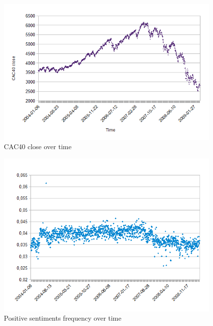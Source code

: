 \documentclass{beamer}
\begin{document}
	\begin{frame}
		\begin{figure}
			\caption{CAC40 close over time}
			\includegraphics[scale=.5]{plots/time/cac.png}
		\end{figure}
	\end{frame}

	\begin{frame}
		\begin{figure}
			\caption{Positive sentiments frequency over time}
			\includegraphics[scale=.5]{plots/time/pos.png}
		\end{figure}
	\end{frame}
\end{document}
